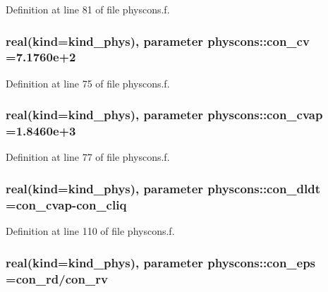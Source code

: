 Definition at line 81 of file physcons.\+f.

\subsubsection[{\texorpdfstring{con\+\_\+cv}{con_cv}}]{\setlength{\rightskip}{0pt plus 5cm}real(kind=kind\+\_\+phys), parameter physcons\+::con\+\_\+cv =7.\+1760e+2}\hypertarget{namespacephyscons_aff20707d9ec92cc8a555f7a4e63cb1dd}{}\label{namespacephyscons_aff20707d9ec92cc8a555f7a4e63cb1dd}


Definition at line 75 of file physcons.\+f.

\subsubsection[{\texorpdfstring{con\+\_\+cvap}{con_cvap}}]{\setlength{\rightskip}{0pt plus 5cm}real(kind=kind\+\_\+phys), parameter physcons\+::con\+\_\+cvap =1.\+8460e+3}\hypertarget{namespacephyscons_a0fc6465a87263f2fd3576365c485f81e}{}\label{namespacephyscons_a0fc6465a87263f2fd3576365c485f81e}


Definition at line 77 of file physcons.\+f.

\subsubsection[{\texorpdfstring{con\+\_\+dldt}{con_dldt}}]{\setlength{\rightskip}{0pt plus 5cm}real(kind=kind\+\_\+phys), parameter physcons\+::con\+\_\+dldt ={\bf con\+\_\+cvap}-\/{\bf con\+\_\+cliq}}\hypertarget{namespacephyscons_a04a189b8dc4814d5d519b4b92ec0cf31}{}\label{namespacephyscons_a04a189b8dc4814d5d519b4b92ec0cf31}


Definition at line 110 of file physcons.\+f.

\subsubsection[{\texorpdfstring{con\+\_\+eps}{con_eps}}]{\setlength{\rightskip}{0pt plus 5cm}real(kind=kind\+\_\+phys), parameter physcons\+::con\+\_\+eps ={\bf con\+\_\+rd}/{\bf con\+\_\+rv}}\hypertarget{namespacephyscons_a25c0b5ef7ed84a574bf7e215ddaee65d}{}\label{namespacephyscons_a25c0b5ef7ed84a574bf7e215ddaee65d}


